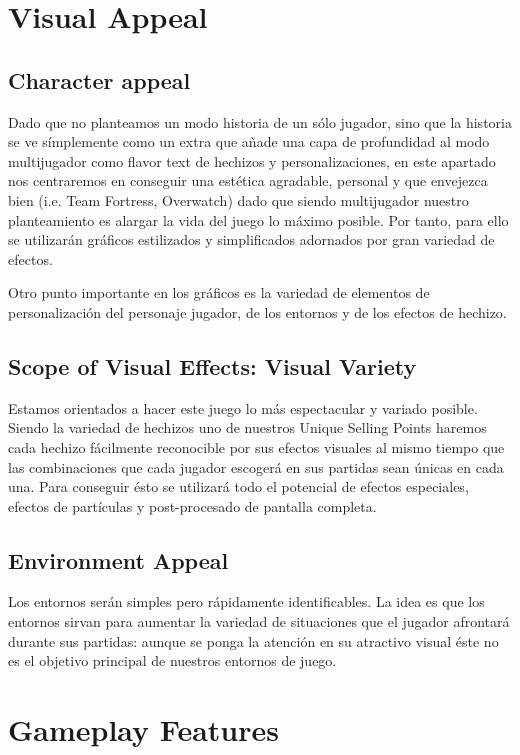 \documentclass[12pt]{report}
\begin{document}
\section{Visual Appeal}

\subsection{Character appeal}

Dado que no planteamos un modo historia de un sólo jugador, sino que la historia se ve símplemente como un extra que añade una capa de profundidad al modo multijugador como flavor text de hechizos y personalizaciones, en este apartado nos centraremos en conseguir una estética agradable, personal y que envejezca bien (i.e. Team Fortress, Overwatch) dado que siendo multijugador nuestro planteamiento es alargar la vida del juego lo máximo posible. Por tanto, para ello se utilizarán gráficos estilizados y simplificados adornados por gran variedad de efectos.

Otro punto importante en los gráficos es la variedad de elementos de personalización del personaje jugador, de los entornos y de los efectos de hechizo.

\subsection{Scope of Visual Effects: Visual Variety}

Estamos orientados a hacer este juego lo más espectacular y variado posible. Siendo la variedad de hechizos uno de nuestros Unique Selling Points haremos cada hechizo fácilmente reconocible por sus efectos visuales al mismo tiempo que las combinaciones que cada jugador escogerá en sus partidas sean únicas en cada una. Para conseguir ésto se utilizará todo el potencial de efectos especiales, efectos de partículas y post-procesado de pantalla completa.

\subsection{Environment Appeal}

Los entornos serán simples pero rápidamente identificables. La idea es que los entornos sirvan para aumentar la variedad de situaciones que el jugador afrontará durante sus partidas: aunque se ponga la atención en su atractivo visual éste no es el objetivo principal de nuestros entornos de juego.

\section{Gameplay Features}     
\end{document}
